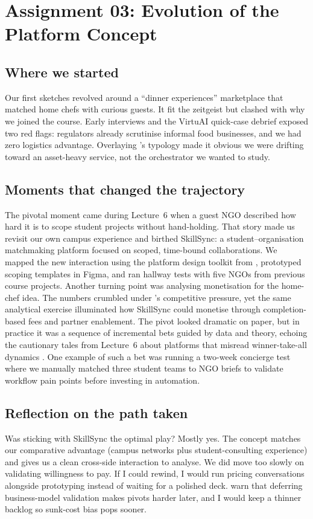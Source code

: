 \section*{Assignment 03: Evolution of the Platform Concept}

\subsection*{Where we started}
Our first sketches revolved around a ``dinner experiences'' marketplace that matched home chefs with curious guests. It fit the zeitgeist but clashed with why we joined the course. Early interviews and the VirtuAI quick-case debrief \citep{Gunasilan2024} exposed two red flags: regulators already scrutinise informal food businesses, and we had zero logistics advantage. Overlaying \citet{Choudary2016}'s typology made it obvious we were drifting toward an asset-heavy service, not the orchestrator we wanted to study.

\subsection*{Moments that changed the trajectory}
The pivotal moment came during Lecture~6 when a guest NGO described how hard it is to scope student projects without hand-holding. That story made us revisit our own campus experience and birthed SkillSync: a student--organisation matchmaking platform focused on scoped, time-bound collaborations. We mapped the new interaction using the platform design toolkit from \citet{Reillier2017}, prototyped scoping templates in Figma, and ran hallway tests with five NGOs from previous course projects. Another turning point was analysing monetisation for the home-chef idea. The numbers crumbled under \citet{Porter2008}'s competitive pressure, yet the same analytical exercise illuminated how SkillSync could monetise through completion-based fees and partner enablement. The pivot looked dramatic on paper, but in practice it was a sequence of incremental bets guided by data and theory, echoing the cautionary tales from Lecture~6 about platforms that misread winner-take-all dynamics \citep{Lecture06}. One example of such a bet was running a two-week concierge test where we manually matched three student teams to NGO briefs to validate workflow pain points before investing in automation.

\subsection*{Reflection on the path taken}
Was sticking with SkillSync the optimal play? Mostly yes. The concept matches our comparative advantage (campus networks plus student-consulting experience) and gives us a clean cross-side interaction to analyse. We did move too slowly on validating willingness to pay. If I could rewind, I would run pricing conversations alongside prototyping instead of waiting for a polished deck. \citet{HagiuWright2013} warn that deferring business-model validation makes pivots harder later, and I would keep a thinner backlog so sunk-cost bias pops sooner.


